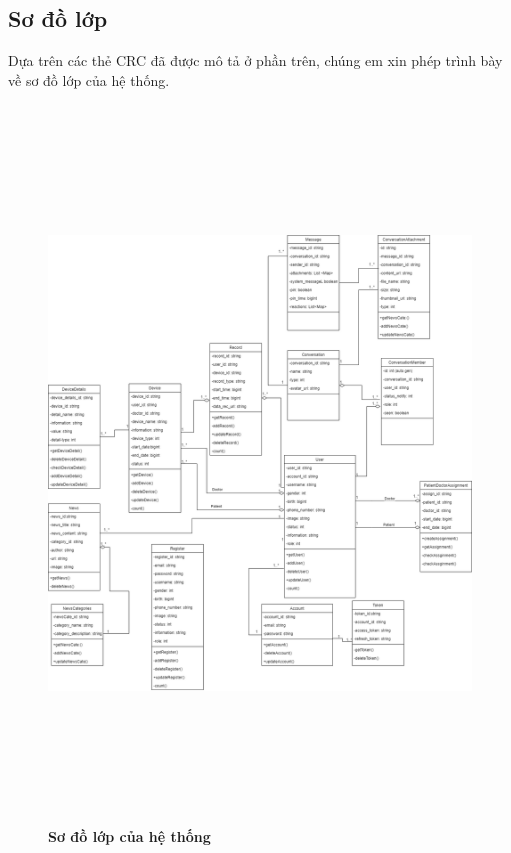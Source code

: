 \subsection{Sơ đồ lớp}
  Dựa trên các thẻ CRC đã được mô tả ở phần trên, chúng em xin phép trình bày về sơ đồ lớp của hệ thống.
  \begin{figure}[H]
    \centering
    \includegraphics*[width = 16cm, height = 19cm ]{Images/UML/UML.drawio.png}
    \caption[Sơ đồ lớp của hệ thống]{\bfseries \fontsize{12pt}{0pt}
    \selectfont Sơ đồ lớp của hệ thống}
    \label{UML}
  \end{figure}

